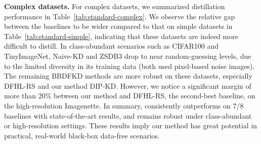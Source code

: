 \begin{foldable}
    \textbf{Complex datasets.}
    For complex datasets, we summarized distillation performance in Table~\ref{tab:standard-complex}.
    We observe the relative gap between the baselines to be wider compared to that on simple datasets in Table~\ref{tab:standard-simple}, indicating that these datasets are indeed more difficult to distill.
    In class-abundant scenarios such as CIFAR100 and TinyImageNet, Naive-KD and ZSDB3 drop to near random-guessing levels, due to the limited diversity in its training data (both used pixel-based noise images).
    The remaining BBDFKD methods are more robust on these datasets, especially DFHL-RS and our method DIP-KD.
    However, we notice a significant margin of more than 20\% between our method and DFHL-RS, the second-best baseline, on the high-resolution Imagenette.
    In summary, {\methodname} consistently outperforms on 7/8 baselines with state-of-the-art results, and remains robust under class-abundant or high-resolution settings.
    These results imply our method {\methodname} has great potential in practical, real-world black-box data-free scenarios.
\end{foldable}


